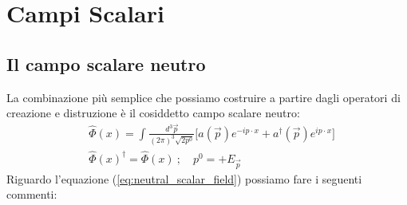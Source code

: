 \documentclass[../main.tex]{subfiles}
\begin{document}
\section{Campi Scalari}
\subsection{Il campo scalare neutro}
La combinazione più semplice che possiamo costruire a partire dagli operatori di creazione e distruzione è il cosiddetto campo scalare neutro:
\begin{equation}
    \begin{aligned}
        &\boxed{\hat{\Phi}(x) = \int_{}\frac{d^3\Vec{p}}{(2\pi)^3\sqrt{2p^0}}\big[ a(\Vec{p})e^{-ip\cdot x} + a^\dagger(\Vec{p})e^{ip\cdot x} \big]}\\
        &\hat{\Phi}(x)^\dagger = \hat{\Phi}(x) ~;\quad p^0=+E_{\Vec{p}} 
    \end{aligned}
    \label{eq:neutral_scalar_field}
\end{equation}
Riguardo l'equazione (\ref{eq:neutral_scalar_field}) possiamo fare i seguenti commenti:
\end{document}
